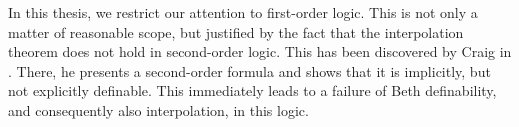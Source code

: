 In this thesis, we restrict our attention to first-order logic.
This is not only a matter of reasonable scope, but justified by the fact that the interpolation theorem does not hold in second-order logic.
This has been discovered by Craig in \cite{Craig65}.
There, he presents a second-order formula and shows that it is implicitly, but not explicitly definable.
This immediately leads to a failure of Beth definability, and consequently also interpolation, in this logic.



